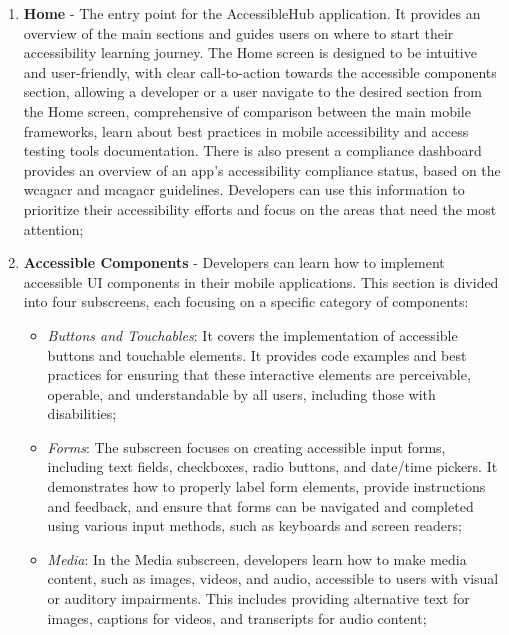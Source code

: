\begin{enumerate}
    \item \textbf{Home} - The entry point for the AccessibleHub application. It provides an overview of the main sections and guides users on where to start their accessibility learning journey. The Home screen is designed to be intuitive and user-friendly, with clear call-to-action towards the accessible components section, allowing a developer or a user navigate to the desired section from the Home screen, comprehensive of comparison between the main mobile frameworks, learn about best practices in mobile accessibility and access testing tools documentation. There is also present a compliance dashboard provides an overview of an app's accessibility compliance status, based on the \acrshort{wcagacr} and \acrshort{mcagacr} guidelines. Developers can use this information to prioritize their accessibility efforts and focus on the areas that need the most attention;

    \item \textbf{Accessible Components} - Developers can learn how to implement accessible UI components in their mobile applications. This section is divided into four subscreens, each focusing on a specific category of components:

    \begin{itemize}
        \item \textit{Buttons and Touchables}: It covers the implementation of accessible buttons and touchable elements. It provides code examples and best practices for ensuring that these interactive elements are perceivable, operable, and understandable by all users, including those with disabilities;

        \item \textit{Forms}: The subscreen focuses on creating accessible input forms, including text fields, checkboxes, radio buttons, and date/time pickers. It demonstrates how to properly label form elements, provide instructions and feedback, and ensure that forms can be navigated and completed using various input methods, such as keyboards and screen readers;

        \item \textit{Media}: In the Media subscreen, developers learn how to make media content, such as images, videos, and audio, accessible to users with visual or auditory impairments. This includes providing alternative text for images, captions for videos, and transcripts for audio content;


\end{itemize}
\end{enumerate}
